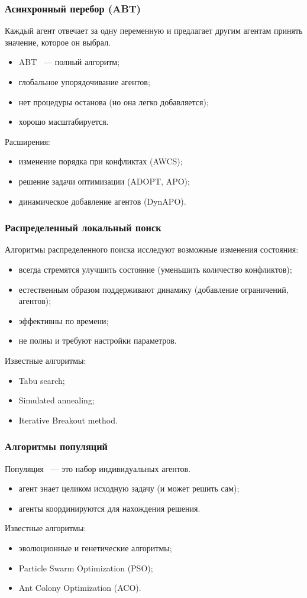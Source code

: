 \documentclass{beamer}
\begin{document}
\begin{frame}
  \frametitle{Асинхронный перебор (ABT)}
  Каждый агент отвечает за одну переменную и предлагает другим агентам принять значение,
  которое он выбрал.
  \begin{itemize}
    \item ABT ~--- полный алгоритм;
    \item глобальное упорядочивание агентов;
    \item нет процедуры останова (но она легко добавляется);
    \item хорошо масштабируется.
  \end{itemize}

  Расширения:
  \begin{itemize}
    \item изменение порядка при конфликтах (AWCS);
    \item решение задачи оптимизации (ADOPT, APO);
    \item динамическое добавление агентов (DynAPO).
  \end{itemize}
\end{frame}

\begin{frame}
  \frametitle{Распределенный локальный поиск}
  Алгоритмы распределенного поиска исследуют возможные изменения состояния:
  \begin{itemize}
    \item всегда стремятся улучшить состояние (уменьшить количество конфликтов);
    \item естественным образом поддерживают динамику (добавление ограничений, агентов);
    \item эффективны по времени;
    \item не полны и требуют настройки параметров.
  \end{itemize}

  Известные алгоритмы:
  \begin{itemize}
    \item Tabu search;
    \item Simulated annealing;
    \item Iterative Breakout method.
  \end{itemize}
\end{frame}

\begin{frame}
  \frametitle{Алгоритмы популяций}
  Популяция ~--- это набор индивидуальных агентов.
  \begin{itemize}
    \item агент знает целиком исходную задачу (и может решить сам);
    \item агенты координируются для нахождения решения.
  \end{itemize}

  Известные алгоритмы:
  \begin{itemize}
    \item эволюционные и генетические алгоритмы;
    \item Particle Swarm Optimization (PSO);
    \item Ant Colony Optimization (ACO).
  \end{itemize}
\end{frame}
\end{document}
